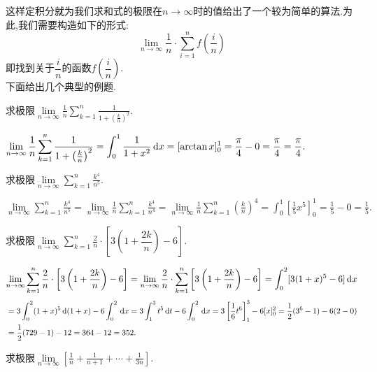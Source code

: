 这样定积分就为我们求和式的极限在$n \to \infty$时的值给出了一个较为简单的算法.为此,我们需要构造如下的形式:
\begin{equation}
\lim\limits_{n \to \infty} \frac{1}{n}\cdot \sum_{i=1}^{n}f\left(\frac{i}{n}\right)
\end{equation}
即找到关于$\dfrac{i}{n}$的函数$f\left(\dfrac{i}{n}\right)$.\\[0.5em]
下面给出几个典型的例题.

\examples 求极限$\displaystyle \lim\limits_{n \to \infty}\frac 1n \sum_{k=1}^{n}\frac{1}{1+\left( \frac{k}{n}\right)^2 }$.

\solve $\displaystyle \lim\limits_{n \to \infty}\frac 1n \sum_{k=1}^{n}\frac{1}{1+\left( \frac{k}{n}\right)^2 }=\int_{0}^{1}\frac{1}{1+x^2}\,{\rm{d}} x=[\arctan x]_0^1=\frac{\pi}{4}-0=\frac{\pi}{4}=\frac{\pi}{4}.$

\summarize
[
\kg 本题的被积函数为$f(x)=\dfrac{1}{1+x^2},$可以代入验证$\displaystyle f\left(\dfrac{k}{n} \right)=\dfrac{1}{1+\left(\frac{k}{n} \right)} $.
]

\examples 求极限$\displaystyle \lim\limits_{n \to \infty}\sum_{k=1}^{n}\frac{k^4}{n^5 }$.

\solve $\displaystyle \lim\limits_{n \to \infty}\sum_{k=1}^{n}\frac{k^4}{n^5 }=\lim\limits_{n \to \infty} \frac 1n \sum_{k=1}^{n}\frac{k^4}{n^4}=\lim\limits_{n \to \infty} \frac 1n \sum_{k=1}^{n}\left( \frac{k}{n}\right)^4=\int_{0}^{1}\left[\frac 15 x^5 \right]_0^1=\frac 15-0=\frac 15.$

\examples 求极限$\displaystyle \lim\limits_{n \to \infty}\sum_{k=1}^{n}\frac{2}{n}\cdot \left[3\left( 1+\dfrac{2k}{n}\right)  -6\right] $.

\solve 
$
\displaystyle
\lim\limits_{n \to \infty}\sum_{k=1}^{n}\frac{2}{n}\cdot \left[3\left( 1+\dfrac{2k}{n}\right)  -6\right]
=\lim\limits_{n \to \infty}\frac{2}{n} \cdot \sum_{k=1}^{n}\left[3\left( 1+\dfrac{2k}{n}\right)  -6\right]
=\int_{0}^{2}[3(1+x)^5-6]\,{\rm{d}} x
$
\begin{align*}
&=3\int_{0}^{2}(1+x)^5\,{\rm{d}}(1+x)-6\int_{0}^{2}\,{\rm{d}} x=3\int_{1}^{3}t^5\,{\rm{d}} t-6\int_{0}^{2}\,{\rm{d}} x=3\left[\frac 16 t^6\right]_1^3-6[x]_0^2=\frac{1}{2}(3^6-1)-6(2-0)\\
&=\frac 12(729-1)-12=364-12=352.
\end{align*}


\vspace*{-2em}
\examples 求极限$\displaystyle \lim\limits_{n \to \infty}\left[ \frac 1n +\frac {1}{n+1}+\cdots+\frac{1}{3n}\right] $.

